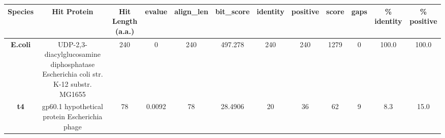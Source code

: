 \begin{tabular}{|c|c|c|c|c|c|c|c|c|c|c|c|} \hline
\textbf{Species} & \textbf{Hit Protein} & \textbf{Hit Length (a.a.)} & \textbf{evalue} & \textbf{align\_len} & \textbf{bit\_score} & \textbf{identity} & \textbf{positive} & \textbf{score} & \textbf{gaps} & \textbf{\% identity} & \textbf{\% positive} \\ \hline
\textbf{E.coli} & UDP-2,3-diacylglucosamine diphosphatase Escherichia coli str. K-12 substr. MG1655 & 240 & 0 & 240 & 497.278 & 240 & 240 & 1279 & 0 & 100.0 & 100.0\\
\textbf{t4} & gp60.1 hypothetical protein Escherichia phage  & 78 & 0.0092 & 78 & 28.4906 & 20 & 36 & 62 & 9 & 8.3 & 15.0\\
\hline \end{tabular}
